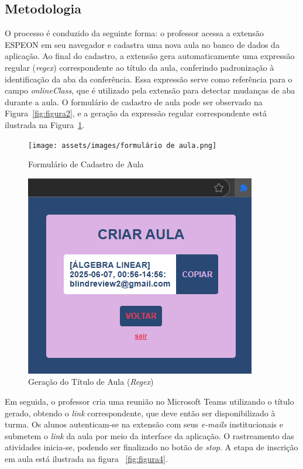 \subsection{Metodologia}
O processo é conduzido da seguinte forma: o professor acessa a extensão ESPEON em seu navegador e cadastra uma nova aula no banco de dados da aplicação. Ao final do cadastro, a extensão gera automaticamente uma expressão regular (\textit{regex}) correspondente ao título da aula, conferindo padronização à identificação da aba da conferência. Essa expressão serve como referência para o campo \textit{onlineClass}, que é utilizado pela extensão para detectar mudanças de aba durante a aula. O formulário de cadastro de aula pode ser observado na Figura~\ref{fig:figura2}, e a geração da expressão regular correspondente está ilustrada na Figura~\ref{fig:figura3}.

\begin{figure}[H]
\centering
\begin{minipage}{0.48\textwidth}
    \centering
    \texttt{[image: assets/images/formulário de aula.png]}
\caption{Formulário de Cadastro de Aula}
\label{fig:figura2}
\end{minipage}\hfill
\begin{minipage}{0.48\textwidth}
    \centering
\includegraphics[width=.9\textwidth]{assets/images/aula criada.png}
\caption{Geração do Título de Aula (\textit{Regex})}
\label{fig:figura3}
\end{minipage}
\end{figure}

Em seguida, o professor cria uma reunião no Microsoft Teams utilizando o título gerado, obtendo o \textit{link} correspondente, que deve então ser disponibilizado à turma. Os alunos autenticam-se na extensão com seus \textit{e-mails} institucionais e submetem o \textit{link} da aula por meio da interface da aplicação. O rastreamento das atividades inicia-se, podendo ser finalizado no botão de \textit{stop}. A etapa de inscrição em aula está ilustrada na figura ~\ref{fig:figura4}.


